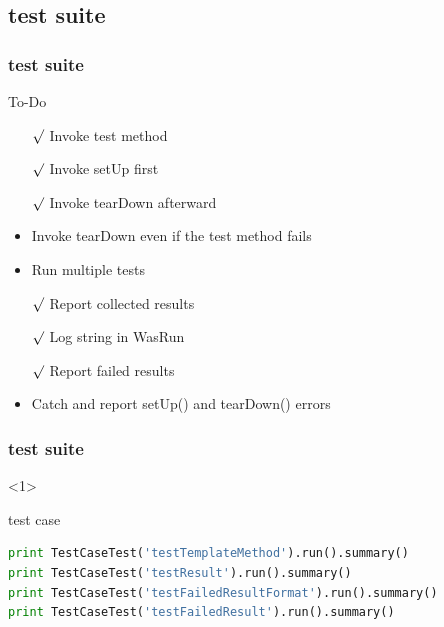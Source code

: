\documentclass[lualatex]{beamer}
\begin{document}
\subsection{test suite}

\begin{frame}
    \frametitle{test suite}

    \begin{block}{To-Do}
        \begin{itemize}
            \item[$\surd$] Invoke test method
            \item[$\surd$] Invoke setUp first 
            \item[$\surd$] Invoke tearDown afterward 
            \item Invoke tearDown even if the test method fails 
            \item Run multiple tests 
            \item[$\surd$] Report collected results 
            \item[$\surd$] Log string in WasRun 
            \item[$\surd$] Report failed results
            \item Catch and report setUp() and tearDown() errors
        \end{itemize}
    \end{block}
\end{frame}

\begin{frame}[fragile,t]
    \frametitle{test suite}

        \small
        \begin{onlyenv}<1>
            \begin{block}{test case}
                \begin{lstlisting}[language=Python,columns=fullflexible]
print TestCaseTest('testTemplateMethod').run().summary()                    
print TestCaseTest('testResult').run().summary()                    
print TestCaseTest('testFailedResultFormat').run().summary()                    
print TestCaseTest('testFailedResult').run().summary()                    
                \end{lstlisting}
            \end{block}
        \end{onlyenv}

\end{frame}
\end{document}
